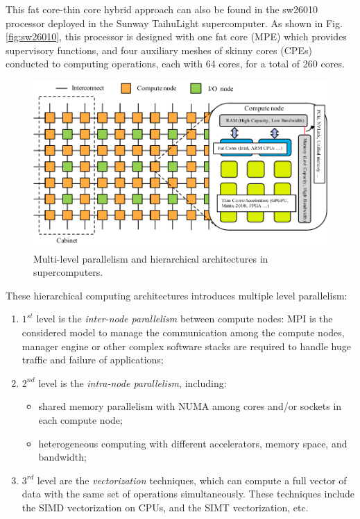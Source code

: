 This fat core-thin core hybrid approach can also be found in the sw26010 processor deployed in the Sunway TaihuLight supercomputer. As shown in Fig. \ref{fig:sw26010}, this processor is designed with one fat core (MPE) which provides supervisory functions, and four auxiliary meshes of skinny cores  (CPEs) conducted to computing operations, each with 64 cores, for a total of 260 cores.

\begin{figure}[htbp]
	\centering
	\includegraphics[width=0.99\linewidth]{fig/supercomputer_arch.pdf}
	\caption{Multi-level parallelism and hierarchical architectures in supercomputers.}
	\label{fig:supercomputer_arch}
\end{figure}

These hierarchical computing architectures introduces multiple level parallelism:

\begin{enumerate}
	\item $1^{st}$ level is the \textit{inter-node parallelism} between compute nodes: MPI is the considered model to manage the communication among the compute nodes, manager engine or other complex software stacks are required to handle huge traffic and failure of applications;
	\item $2^{nd}$ level is the \textit{intra-node parallelism}, including:
	\begin{itemize}
		\item shared memory parallelism with NUMA among cores and/or sockets in each compute node;
		\item heterogeneous computing with different accelerators, memory space, and bandwidth;
	\end{itemize}
	\item $3^{rd}$ level are the \textit{vectorization} techniques, which can compute a full vector of data with the same set of operations simultaneously. These techniques include the SIMD vectorization on CPUs, and the SIMT vectorization, etc.
\end{enumerate}

